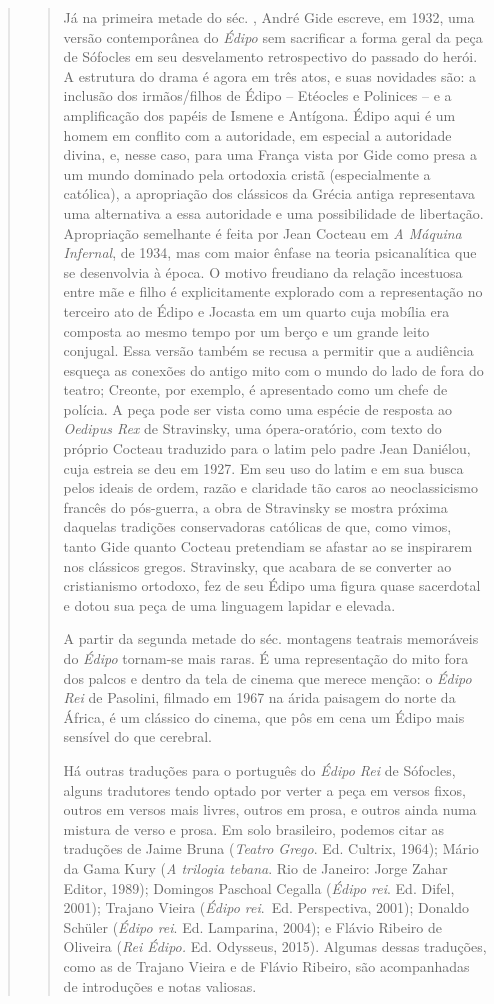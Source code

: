 \begin{verse}
\begin{verse}
Já na primeira metade do séc. , André Gide escreve, em 1932,
uma versão contemporânea do \emph{Édipo} sem sacrificar a forma geral da
peça de Sófocles em seu desvelamento retrospectivo do passado do herói.
A estrutura do drama é agora em três atos, e suas novidades são: a
inclusão dos irmãos/filhos de Édipo -- Etéocles e Polinices -- e a
amplificação dos papéis de Ismene e Antígona. Édipo aqui é um homem em
conflito com a autoridade, em especial a autoridade divina, e, nesse
caso, para uma França vista por Gide como presa a um mundo dominado pela
ortodoxia cristã (especialmente a católica), a apropriação dos clássicos
da Grécia antiga representava uma alternativa a essa autoridade e uma
possibilidade de libertação. Apropriação semelhante é feita por
Jean Cocteau em \emph{A Máquina Infernal}, de 1934, mas com
maior ênfase na teoria psicanalítica que se desenvolvia à época. O
motivo freudiano da relação incestuosa entre mãe e filho é
explicitamente explorado com a representação no terceiro ato de Édipo e
Jocasta em um quarto cuja mobília era composta ao mesmo tempo por um
berço e um grande leito conjugal. Essa versão também se recusa a
permitir que a audiência esqueça as conexões do antigo mito com o mundo
do lado de fora do teatro; Creonte, por exemplo, é apresentado como um
chefe de polícia. A peça pode ser vista como uma espécie de resposta ao
\emph{Oedipus Rex} de Stravinsky, uma ópera-oratório, com texto
do próprio Cocteau traduzido para o latim pelo padre Jean Daniélou, cuja
estreia se deu em 1927. Em seu uso do latim e em sua busca pelos ideais
de ordem, razão e claridade tão caros ao neoclassicismo francês do
pós-guerra, a obra de Stravinsky se mostra próxima daquelas tradições
conservadoras católicas de que, como vimos, tanto Gide quanto Cocteau
pretendiam se afastar ao se inspirarem nos clássicos gregos. Stravinsky,
que acabara de se converter ao cristianismo ortodoxo, fez de seu Édipo
uma figura quase sacerdotal e dotou sua peça de uma linguagem lapidar e
elevada.

A partir da segunda metade do séc.  montagens teatrais memoráveis do
\emph{Édipo} tornam-se mais raras. É uma representação do mito fora dos
palcos e dentro da tela de cinema que merece menção: o \emph{Édipo Rei}
de Pasolini, filmado em 1967 na árida paisagem do norte da
África, é um clássico do cinema, que pôs em cena um Édipo mais sensível
do que cerebral.

Há outras traduções para o português do \emph{Édipo Rei} de Sófocles,
alguns tradutores tendo optado por verter a peça em versos fixos, outros
em versos mais livres, outros em prosa, e outros ainda numa mistura de
verso e prosa. Em solo brasileiro, podemos citar as traduções de Jaime
Bruna (\emph{Teatro Grego}. Ed.
Cultrix, 1964); Mário
da Gama Kury (\emph{A trilogia tebana}. Rio de Janeiro: Jorge Zahar
Editor, 1989); Domingos Paschoal Cegalla (\emph{Édipo rei}. Ed. Difel,
2001); Trajano Vieira (\emph{Édipo rei}.~Ed. Perspectiva, 2001);
Donaldo Schüler (\emph{Édipo rei}. Ed.
Lamparina, 2004); e
Flávio Ribeiro de Oliveira (\emph{Rei Édipo.} Ed. Odysseus, 2015).
Algumas dessas traduções, como as de Trajano Vieira e de Flávio Ribeiro,
são acompanhadas de introduções e notas valiosas.


\end{verse}
\end{verse}
